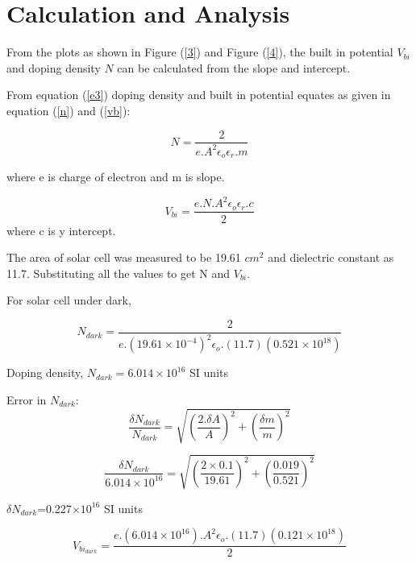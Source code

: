 \documentclass[a4paper, amsfonts, amssymb, amsmath, reprint, showkeys, nofootinbib, twoside]{revtex4-1}
\begin{document}
\section{Calculation and Analysis}
From the plots as shown in Figure (\ref{3}) and Figure (\ref{4}), the built in potential $ V_{bi} $ and doping density $ N $ can be calculated from the slope and intercept.

From equation (\ref{e3}) doping density and built in potential equates as given in equation (\ref{n}) and (\ref{vb}):

\begin{equation}\label{n}
	N=\frac{2}{e.A^{2} \epsilon_o\epsilon_r.m}
\end{equation}

where e is charge of electron and m is slope.

\begin{equation}\label{vb}
	V_{bi}=\frac{e.N.A^{2} \epsilon_o\epsilon_r.c}{2}
\end{equation}
where c is y intercept.

The area of solar cell was measured to be 19.61 $cm^{2}$ and dielectric constant as 11.7. Substituting all the values to get N and $V_{bi}$.

For solar cell under dark,

\begin{equation}
	N_{dark}=\frac{2}{e.(19.61\times10^{-4})^{2} \epsilon_o.(11.7)(0.521\times10^{18})}
\end{equation}

Doping density, $N_{dark}=6.014\times10^{16}$ SI units

Error in $N_{dark}$:
\begin{equation}
	\frac{\delta N_{dark}}{ N_{dark}}=\sqrt{\left( \frac{2.\delta A}{A}\right) ^{2}+\left( \frac{\delta m}{m}\right) ^{2}}
\end{equation}

\begin{equation}
	\frac{\delta N_{dark}}{ 6.014\times10^{16}}=\sqrt{\left( \frac{2\times0.1}{19.61}\right) ^{2}+\left( \frac{0.019}{0.521}\right) ^{2}}
\end{equation}

$\delta N_{dark}$=0.227$\times10^{16}$ SI units

\begin{equation}%
	V_{bi_{dark}}=\frac{e.(6.014\times10^{16}).A^{2} \epsilon_o.(11.7)(0.121\times10^{18})}{2}
\end{equation}
\end{document}
